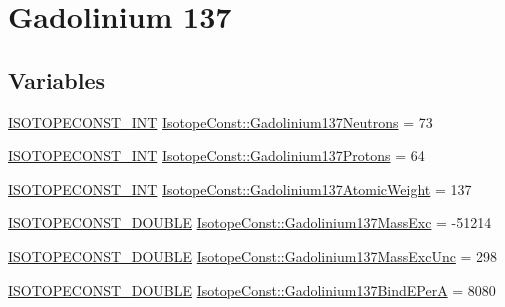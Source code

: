 \hypertarget{group___isotope_const-_gadolinium-_gd137}{}\section{Gadolinium 137}
\label{group___isotope_const-_gadolinium-_gd137}
\subsection*{Variables}
\begin{DoxyCompactItemize}
\item 
\mbox{\hyperlink{group___isotope_const-_macros_ga5f18360b3e99483a35c32d789e62621c}{I\+S\+O\+T\+O\+P\+E\+C\+O\+N\+S\+T\+\_\+\+I\+NT}} \mbox{\hyperlink{group___isotope_const-_gadolinium-_gd137_ga6393d385583e694fe7568b77494a72d0}{Isotope\+Const\+::\+Gadolinium137\+Neutrons}} = 73
\item 
\mbox{\hyperlink{group___isotope_const-_macros_ga5f18360b3e99483a35c32d789e62621c}{I\+S\+O\+T\+O\+P\+E\+C\+O\+N\+S\+T\+\_\+\+I\+NT}} \mbox{\hyperlink{group___isotope_const-_gadolinium-_gd137_gae89265c40fb7e35e5e0aa9b0f3fb9ebb}{Isotope\+Const\+::\+Gadolinium137\+Protons}} = 64
\item 
\mbox{\hyperlink{group___isotope_const-_macros_ga5f18360b3e99483a35c32d789e62621c}{I\+S\+O\+T\+O\+P\+E\+C\+O\+N\+S\+T\+\_\+\+I\+NT}} \mbox{\hyperlink{group___isotope_const-_gadolinium-_gd137_gaf63a0a7b9b32ff9ed2c5187b7018cd6d}{Isotope\+Const\+::\+Gadolinium137\+Atomic\+Weight}} = 137
\item 
\mbox{\hyperlink{group___isotope_const-_macros_ga8f45a7272ce02c0b4c65c44636ed719a}{I\+S\+O\+T\+O\+P\+E\+C\+O\+N\+S\+T\+\_\+\+D\+O\+U\+B\+LE}} \mbox{\hyperlink{group___isotope_const-_gadolinium-_gd137_gab29cb9a0df77c6541f1ec3b893e21d16}{Isotope\+Const\+::\+Gadolinium137\+Mass\+Exc}} = -\/51214
\item 
\mbox{\hyperlink{group___isotope_const-_macros_ga8f45a7272ce02c0b4c65c44636ed719a}{I\+S\+O\+T\+O\+P\+E\+C\+O\+N\+S\+T\+\_\+\+D\+O\+U\+B\+LE}} \mbox{\hyperlink{group___isotope_const-_gadolinium-_gd137_gac47d8cd132a6d868df029034c7273d2d}{Isotope\+Const\+::\+Gadolinium137\+Mass\+Exc\+Unc}} = 298
\item 
\mbox{\hyperlink{group___isotope_const-_macros_ga8f45a7272ce02c0b4c65c44636ed719a}{I\+S\+O\+T\+O\+P\+E\+C\+O\+N\+S\+T\+\_\+\+D\+O\+U\+B\+LE}} \mbox{\hyperlink{group___isotope_const-_gadolinium-_gd137_ga16b9e43e32a4d328403be4dbfd129b09}{Isotope\+Const\+::\+Gadolinium137\+Bind\+E\+PerA}} = 8080
\item 

\end{DoxyCompactItemize}
